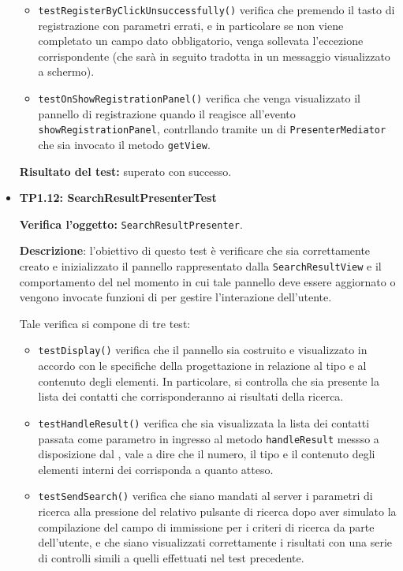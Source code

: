 \begin{itemize}
\begin{itemize}
\item \texttt{testRegisterByClickUnsuccessfully()} verifica che premendo il tasto di registrazione con parametri errati, e in particolare se non viene completato un campo dato obbligatorio, venga sollevata l'eccezione corrispondente (che sarà in seguito tradotta in un messaggio visualizzato a schermo).

\item \texttt{testOnShowRegistrationPanel()} verifica che venga visualizzato il pannello di registrazione quando il  reagisce all'evento \verb'showRegistrationPanel', contrllando tramite un  di \texttt{PresenterMediator} che sia invocato il metodo \verb'getView'.

\end{itemize}
\textbf{Risultato del test:} superato con successo.

\item[\passed] \textbf{TP1.12: SearchResultPresenterTest}

\textbf{Verifica l'oggetto:} \texttt{SearchResultPresenter}.

\textbf{Descrizione}: l'obiettivo di questo test è verificare che sia correttamente creato e inizializzato il pannello rappresentato dalla \texttt{SearchResultView} e il comportamento del  nel momento in cui tale pannello deve essere aggiornato o vengono invocate funzioni di  per gestire l'interazione dell'utente.

Tale verifica si compone di tre test:
\begin{itemize}
\item \texttt{testDisplay()} verifica che il pannello sia costruito e visualizzato in accordo con le specifiche della progettazione in relazione al tipo e al contenuto degli elementi. In particolare, si controlla che sia presente la lista dei contatti che corrisponderanno ai risultati della ricerca.

\item \texttt{testHandleResult()} verifica che sia visualizzata la lista dei contatti passata come parametro in ingresso al metodo \texttt{handleResult} messso a disposizione dal , vale a dire che il numero, il tipo e il contenuto degli elementi interni dei  corrisponda a quanto atteso.

\item \texttt{testSendSearch()} verifica che siano mandati al server i parametri di ricerca alla pressione del relativo pulsante di ricerca dopo aver simulato la compilazione del campo di immissione per i criteri di ricerca da parte dell'utente, e che siano visualizzati correttamente i risultati con una serie di controlli simili a quelli effettuati nel test precedente.


\end{itemize}
\end{itemize}
